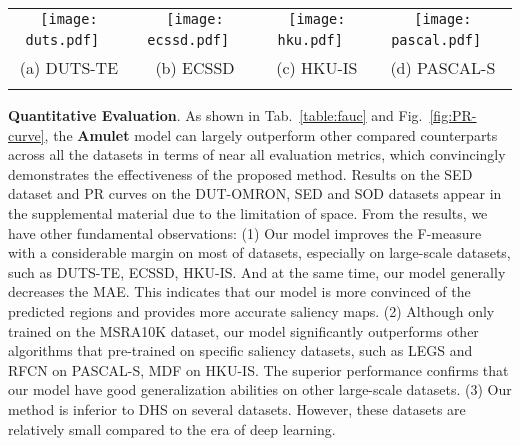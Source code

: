\documentclass[10pt,twocolumn,letterpaper]{article}
\begin{document}
\begin{figure*}
\begin{center}
\begin{tabular}{@{}c@{}c@{}c@{}c}
\texttt{[image: duts.pdf]} \ &
\texttt{[image: ecssd.pdf]} \ &
\texttt{[image: hku.pdf]} \ &
\texttt{[image: pascal.pdf]} \ \\
{\small(a) DUTS-TE} & {\small(b) ECSSD} & {\small(c) HKU-IS} & {\small(d) PASCAL-S}\\ \\
\end{tabular}
\vspace{-6mm}
\caption{The PR curves of the proposed algorithm and other state-of-the-art methods.
\label{fig:PR-curve}}
\end{center}
\vspace{-10mm}
\end{figure*}

\textbf{Quantitative Evaluation}. As shown in Tab.~\ref{table:fauc} and Fig.~\ref{fig:PR-curve}, the \textbf{Amulet} model can largely outperform other compared counterparts across all the datasets in terms of near all evaluation metrics, which convincingly demonstrates the effectiveness of the proposed method.
Results on the SED dataset and PR curves on the DUT-OMRON, SED and SOD datasets appear in the supplemental material due to the limitation of space.
From the results, we have other fundamental observations: (1) Our model improves the F-measure with a considerable margin on most of datasets, especially on large-scale datasets, such as DUTS-TE, ECSSD, HKU-IS.
And at the same time, our model generally decreases the MAE.
This indicates that our model is more convinced of the predicted regions and provides more accurate saliency maps.
(2) Although only trained on the MSRA10K dataset, our model significantly outperforms other algorithms that pre-trained on specific saliency datasets, such as LEGS and RFCN on PASCAL-S, MDF on HKU-IS.
The superior performance confirms that our model have good generalization abilities on other large-scale datasets.
(3) Our method is inferior to DHS on several datasets. However, these datasets are relatively small compared to the era of deep learning.
\end{document}
